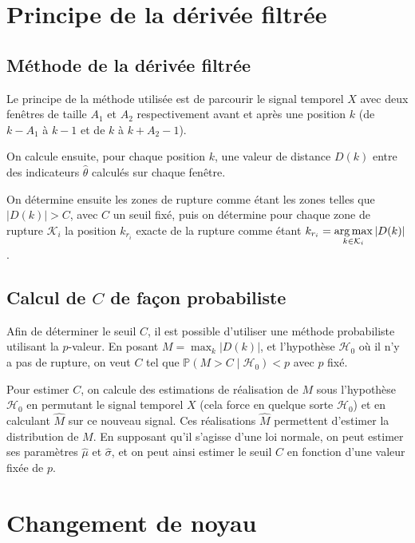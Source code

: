 \section{Principe de la dérivée filtrée}

\subsection{Méthode de la dérivée filtrée}

Le principe de la méthode utilisée est de parcourir le signal temporel $X$ avec deux fenêtres de taille $A_1$ et $A_2$ respectivement avant et après une position $k$ (de $k - A_1$ à $k-1$ et de $k$ à $k+A_2-1$).

On calcule ensuite, pour chaque position $k$, une valeur de distance $D(k)$ entre des indicateurs $\hat{\theta}$ calculés sur chaque fenêtre.

On détermine ensuite les zones de rupture comme étant les zones telles que $|D(k)| > C$, avec $C$ un seuil fixé, puis on détermine pour chaque zone de rupture $\mathcal{K}_i$ la position $k_{r_i}$ exacte de la rupture comme étant $k_{r_i} = \displaystyle \operatorname*{arg\,max}_{k \in \mathcal{K}_i} |D(k)|$.

\subsection{Calcul de $C$ de façon probabiliste}

Afin de déterminer le seuil $C$, il est possible d'utiliser une méthode probabiliste utilisant la $p$-valeur. En posant $M = \displaystyle \max_{k} |D(k)|$, et l'hypothèse $\mathcal{H}_0$ où il n'y a pas de rupture, on veut $C$ tel que $\mathbb{P}(M>C\mid	\mathcal{H}_0) < p$ avec $p$ fixé.

Pour estimer $C$, on calcule des estimations de réalisation de $M$ sous l'hypothèse $\mathcal{H}_0$ en permutant le signal temporel $X$ (cela force en quelque sorte $\mathcal{H}_0$) et en calculant $\hat{M}$ sur ce nouveau signal. Ces réalisations $\hat{M}$ permettent d'estimer la distribution de $M$. En supposant qu'il s'agisse d'une loi normale, on peut estimer ses paramètres $\hat{\mu}$ et $\hat{\sigma}$, et on peut ainsi estimer le seuil $C$ en fonction d'une valeur fixée de $p$.

\section{Changement de noyau}

